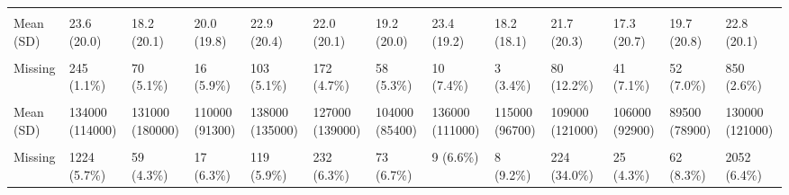 \documentclass[
  single column]{article}
\begin{document}
\begin{landscape}
\begin{longtable}[t]{lllllllllllll}
\cellcolor{gray!10}{Hours Working per Week} & \cellcolor{gray!10}{} & \cellcolor{gray!10}{} & \cellcolor{gray!10}{} & \cellcolor{gray!10}{} & \cellcolor{gray!10}{} & \cellcolor{gray!10}{} & \cellcolor{gray!10}{} & \cellcolor{gray!10}{} & \cellcolor{gray!10}{} & \cellcolor{gray!10}{} & \cellcolor{gray!10}{} & \cellcolor{gray!10}{}\\
Mean (SD) & 23.6 (20.0) & 18.2 (20.1) & 20.0 (19.8) & 22.9 (20.4) & 22.0 (20.1) & 19.2 (20.0) & 23.4 (19.2) & 18.2 (18.1) & 21.7 (20.3) & 17.3 (20.7) & 19.7 (20.8) & 22.8 (20.1)\\
\addlinespace
\cellcolor{gray!10}{Median [Min, Max]} & \cellcolor{gray!10}{28.0 [0, 100]} & \cellcolor{gray!10}{9.00 [0, 80.0]} & \cellcolor{gray!10}{20.0 [0, 70.0]} & \cellcolor{gray!10}{24.0 [0, 100]} & \cellcolor{gray!10}{20.8 [0, 100]} & \cellcolor{gray!10}{12.0 [0, 90.0]} & \cellcolor{gray!10}{30.0 [0, 70.0]} & \cellcolor{gray!10}{16.5 [0, 60.0]} & \cellcolor{gray!10}{20.0 [0, 100]} & \cellcolor{gray!10}{1.00 [0, 100]} & \cellcolor{gray!10}{13.5 [0, 100]} & \cellcolor{gray!10}{25.0 [0, 100]}\\
Missing & 245 (1.1\%) & 70 (5.1\%) & 16 (5.9\%) & 103 (5.1\%) & 172 (4.7\%) & 58 (5.3\%) & 10 (7.4\%) & 3 (3.4\%) & 80 (12.2\%) & 41 (7.1\%) & 52 (7.0\%) & 850 (2.6\%)\\
\cellcolor{gray!10}{Household Income} & \cellcolor{gray!10}{} & \cellcolor{gray!10}{} & \cellcolor{gray!10}{} & \cellcolor{gray!10}{} & \cellcolor{gray!10}{} & \cellcolor{gray!10}{} & \cellcolor{gray!10}{} & \cellcolor{gray!10}{} & \cellcolor{gray!10}{} & \cellcolor{gray!10}{} & \cellcolor{gray!10}{} & \cellcolor{gray!10}{}\\
Mean (SD) & 134000 (114000) & 131000 (180000) & 110000 (91300) & 138000 (135000) & 127000 (139000) & 104000 (85400) & 136000 (111000) & 115000 (96700) & 109000 (121000) & 106000 (92900) & 89500 (78900) & 130000 (121000)\\
\cellcolor{gray!10}{Median [Min, Max]} & \cellcolor{gray!10}{110000 [0, 2500000]} & \cellcolor{gray!10}{90000 [0, 4000000]} & \cellcolor{gray!10}{90000 [0, 670000]} & \cellcolor{gray!10}{110000 [0, 2800000]} & \cellcolor{gray!10}{100000 [0, 5000000]} & \cellcolor{gray!10}{80000 [0, 900000]} & \cellcolor{gray!10}{120000 [0, 700000]} & \cellcolor{gray!10}{99000 [20000, 600000]} & \cellcolor{gray!10}{90000 [0, 2000000]} & \cellcolor{gray!10}{80000 [8500, 1000000]} & \cellcolor{gray!10}{70000 [0, 900000]} & \cellcolor{gray!10}{100000 [0, 5000000]}\\
\addlinespace
Missing & 1224 (5.7\%) & 59 (4.3\%) & 17 (6.3\%) & 119 (5.9\%) & 232 (6.3\%) & 73 (6.7\%) & 9 (6.6\%) & 8 (9.2\%) & 224 (34.0\%) & 25 (4.3\%) & 62 (8.3\%) & 2052 (6.4\%)\\

\end{longtable}
\end{landscape}
\end{document}
